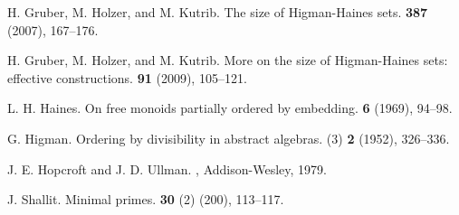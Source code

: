\documentclass[12pt]{article}
\theoremstyle{plain}
\theoremstyle{definition}
\theoremstyle{remark}
\begin{document}

\begin{thebibliography}{9}

  H. Gruber, M. Holzer, and M. Kutrib.
\newblock The size of Higman-Haines sets.
 {\bf 387} (2007), 167--176.

  H. Gruber, M. Holzer, and M. Kutrib.
\newblock More on the size of Higman-Haines sets:  effective constructions.
 {\bf 91} (2009), 105--121.

  L. H. Haines.
\newblock On free monoids partially ordered by embedding.
 {\bf 6} (1969), 94--98.

  G. Higman.
\newblock Ordering by divisibility in abstract algebras.
 (3) {\bf 2} (1952), 326--336.

  J. E. Hopcroft and J. D. Ullman.
,
Addison-Wesley, 1979.

  J. Shallit.
\newblock Minimal primes.
 {\bf 30} (2) (200), 113--117.

\end{thebibliography}
\end{document}
